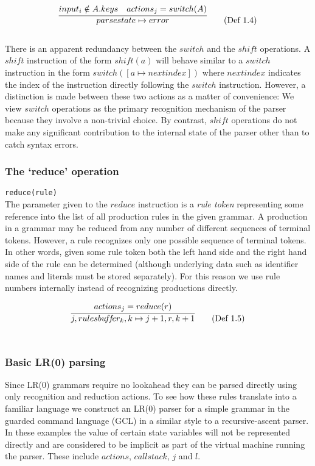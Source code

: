 \documentclass[a4paper,11pt]{article}
\begin{document}
\begin{equation}
\infer{parsestate \mapsto error}{input_i \notin A.keys & actions_j = switch(A)} \tag{Def 1.4}
\end{equation}\\

There is an apparent redundancy between the $switch$ and the $shift$ operations. 
A $shi\!ft$ instruction of the form $sh\!ift(a)$ will behave similar to a $switch$ instruction in the form $switch([a \mapsto nextindex])$ where $nextindex$ indicates the index of the instruction directly following the $switch$ instruction.
However, a distinction is made between these two actions as a matter of convenience: 
We view $switch$ operations as the primary recognition mechanism of the parser because they involve a non-trivial choice.
By contrast, $shi\!ft$ operations do not make any significant contribution to the internal state of the parser other than to catch syntax errors.
	
\subsubsection{The `reduce' operation}
\texttt{reduce(rule)}\\
The parameter given to the $reduce$ instruction is a \emph{rule token} representing some reference into the list of all production rules in the given grammar.
A production in a grammar may be reduced from any number of different sequences of terminal tokens. However, a rule recognizes only one possible sequence of terminal tokens.
In other words, given some rule token both the left hand side and the right hand side of the rule can be determined (although underlying data such as identifier names and literals must be stored separately).
For this reason we use rule numbers internally instead of recognizing productions directly.

\begin{equation}
\infer{j, rulesbu\!f\!f\!er_k, k \mapsto j+1, r, k+1}{actions_j = reduce(r)} \tag{Def 1.5}
\end{equation}\\

\subsubsection{Basic LR(0) parsing}

Since LR(0) grammars require no lookahead they can be parsed directly using only recognition and reduction actions.
To see how these rules translate into a familiar language we construct an LR(0) parser for a simple grammar in the guarded command language (GCL) in a similar style to a recursive-ascent parser.
In these examples the value of certain state variables will not be represented directly and are considered to be implicit as part of the virtual machine running the parser.
These include $actions$, $callstack$, $j$ and $l$.
\end{document}
